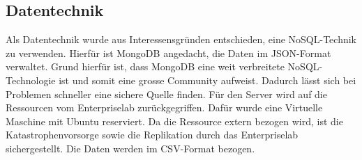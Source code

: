 \documentclass[12pt,titlepage]{article}
\begin{document}
\subsection{Datentechnik}
Als Datentechnik wurde aus Interessensgründen entschieden, eine NoSQL-Technik zu verwenden. Hierfür ist MongoDB angedacht, die Daten im JSON-Format verwaltet. Grund hierfür ist, dass MongoDB eine weit verbreitete NoSQL-Technologie ist und somit eine grosse Community aufweist. Dadurch lässt sich bei Problemen schneller eine sichere Quelle finden. Für den Server wird auf die Ressourcen vom Enterpriselab zurückgegriffen. Dafür wurde eine Virtuelle Maschine mit Ubuntu reserviert. Da die Ressource extern bezogen wird, ist die Katastrophenvorsorge sowie die Replikation durch das Enterpriselab sichergestellt.
Die Daten werden im CSV-Format bezogen.
\end{document}

